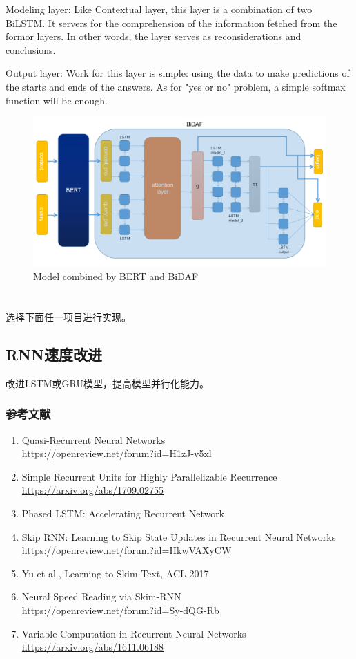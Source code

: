 \documentclass{article}
\begin{document}
Modeling layer: Like Contextual layer, this layer is a combination of two BiLSTM. It servers for the comprehension of the information fetched from the formor layers. In other words, the layer serves as reconsiderations and conclusions. 

Output layer: Work for this layer is simple: using the data to make predictions of the starts and ends of the answers. As for "yes or no" problem, a simple softmax function will be enough. 

\begin{figure}[h]
	\centering
	\includegraphics[scale=0.3 ]{Model.png}
	\caption{Model combined by BERT and BiDAF}
\end{figure}
\section{}

选择下面任一项目进行实现。

\subsection{RNN速度改进}
改进LSTM或GRU模型，提高模型并行化能力。

\subsubsection{参考文献}
\begin{enumerate}
    \item Quasi-Recurrent Neural Networks\\ \url{https://openreview.net/forum?id=H1zJ-v5xl}
    \item Simple Recurrent Units for Highly Parallelizable Recurrence\\ \url{https://arxiv.org/abs/1709.02755}
    \item Phased LSTM: Accelerating Recurrent Network
    \item Skip RNN: Learning to Skip State Updates in Recurrent Neural Networks\\ \url{https://openreview.net/forum?id=HkwVAXyCW}
    \item Yu et al., Learning to Skim Text, ACL 2017
    \item Neural Speed Reading via Skim-RNN\\ \url{https://openreview.net/forum?id=Sy-dQG-Rb}
    \item Variable Computation in Recurrent Neural Networks\\
    \url{https://arxiv.org/abs/1611.06188}
\end{enumerate}
\end{document}
